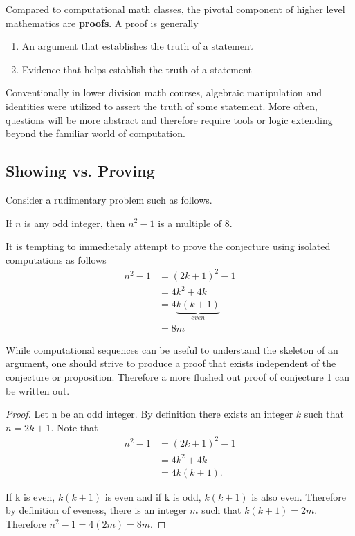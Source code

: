 \documentclass[../notes.tex]{subfiles}
\begin{document}

Compared to computational math classes, the pivotal component of higher level mathematics are \textbf{proofs}. A proof is generally

\begin{enumerate}
	\item An argument that establishes the truth of a statement
	\item Evidence that helps establish the truth of a statement
\end{enumerate}

Conventionally in lower division math courses, algebraic manipulation and identities were utilized to assert the truth of some statement. More often, questions will be more abstract and therefore require tools or logic extending beyond the familiar world of computation.

\subsection{Showing vs. Proving}

Consider a rudimentary problem such as follows.

\begin{conjecture}
  If $n$ is any odd integer, then $n^2 - 1$ is a multiple of 8.
\end{conjecture}

It is tempting to immedietaly attempt to prove the conjecture using isolated computations as follows
\begin{align*}
	n^2-1 &= (2k+1)^2 - 1 \\
				&= 4k^2 + 4k \\
				&= 4\underbrace{k (k+1)}_{even} \\
				&= 8m
\end{align*}

While computational sequences can be useful to understand the skeleton of an argument, one should strive to produce a proof that exists independent of the conjecture or proposition. Therefore a more flushed out proof of conjecture 1 can be written out.

\begin{proof}
	Let n be an odd integer. By definition there exists an integer $k$ such that $n = 2k+1$. Note that
	\begin{align*}
		n^2-1 &= (2k+1)^2 - 1 \\
					&= 4k^2 + 4k \\
					&= 4k (k+1)
	.\end{align*}

If k is even, $k(k+1)$ is even and if k is odd, $k(k+1)$ is also even. Therefore by definition of eveness, there is an integer $m$ such that $k(k+1) = 2m$. Therefore $n^2-1 = 4(2m) = 8m$.
\end{proof}
\end{document}
